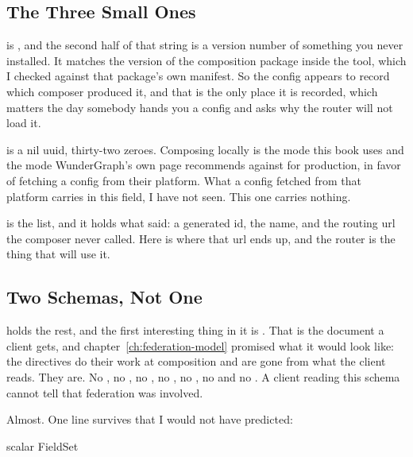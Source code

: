 \subsection{The Three Small Ones}

%
 is , and the second half of that
string is a version number of something you never installed. It matches the
version of the composition package inside the tool, which I checked against
that package's own manifest. So the config appears to record which composer
produced it, and that is the only place it is recorded, which matters the day
somebody hands you a config and asks why the router will not load it.

%
 is a nil uuid, thirty-two zeroes. Composing locally is the mode
this book uses and the mode WunderGraph's own page recommends against for
production, in favor of fetching a config from their platform. What a config
fetched from that platform carries in this field, I have not seen. This one
carries nothing.

%
 is the list, and it holds what  said: a
generated id, the name, and the routing url the composer never called. Here is
where that url ends up, and the router is the thing that will use it.

\subsection{Two Schemas, Not One}

%
 holds the rest, and the first interesting thing in it is
. That is the document a client gets, and
chapter~\ref{ch:federation-model} promised what it would look like: the
directives do their work at composition and are gone from what the client
reads. They are. No , no , no , no
, no , no  and no .
A client reading this schema cannot tell that federation was involved.

%
Almost. One line survives that I would not have predicted:

\begin{graphqlsdl}
scalar FieldSet
\end{graphqlsdl}

